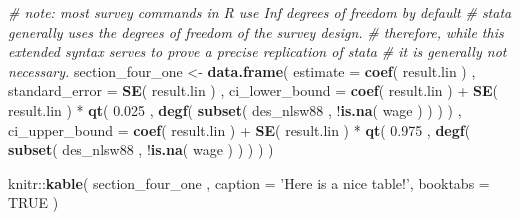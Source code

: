 \documentclass[]{book}
\newenvironment{Shaded}{\begin{snugshade}}{\end{snugshade}}
\newcommand{\KeywordTok}[1]{\textcolor[rgb]{0.13,0.29,0.53}{\textbf{{#1}}}}
\newcommand{\DataTypeTok}[1]{\textcolor[rgb]{0.13,0.29,0.53}{{#1}}}
\newcommand{\FloatTok}[1]{\textcolor[rgb]{0.00,0.00,0.81}{{#1}}}
\newcommand{\StringTok}[1]{\textcolor[rgb]{0.31,0.60,0.02}{{#1}}}
\newcommand{\CommentTok}[1]{\textcolor[rgb]{0.56,0.35,0.01}{\textit{{#1}}}}
\newcommand{\OtherTok}[1]{\textcolor[rgb]{0.56,0.35,0.01}{{#1}}}
\newcommand{\NormalTok}[1]{{#1}}
\begin{document}
\begin{Shaded}
\begin{Highlighting}[]
\CommentTok{# note: most survey commands in R use Inf degrees of freedom by default}
\CommentTok{# stata generally uses the degrees of freedom of the survey design.}
\CommentTok{# therefore, while this extended syntax serves to prove a precise replication of stata}
\CommentTok{# it is generally not necessary.}
\NormalTok{section_four_one <-}
\StringTok{    }\KeywordTok{data.frame}\NormalTok{( }
        \DataTypeTok{estimate =} \KeywordTok{coef}\NormalTok{( result.lin ) , }
        \DataTypeTok{standard_error =} \KeywordTok{SE}\NormalTok{( result.lin ) , }
        \DataTypeTok{ci_lower_bound =} 
            \KeywordTok{coef}\NormalTok{( result.lin ) +}\StringTok{ }
\StringTok{            }\KeywordTok{SE}\NormalTok{( result.lin ) *}\StringTok{ }
\StringTok{            }\KeywordTok{qt}\NormalTok{( }\FloatTok{0.025} \NormalTok{, }\KeywordTok{degf}\NormalTok{( }\KeywordTok{subset}\NormalTok{( des_nlsw88 , !}\KeywordTok{is.na}\NormalTok{( wage ) ) ) ) ,}
        \DataTypeTok{ci_upper_bound =} 
            \KeywordTok{coef}\NormalTok{( result.lin ) +}\StringTok{ }
\StringTok{            }\KeywordTok{SE}\NormalTok{( result.lin ) *}\StringTok{ }
\StringTok{            }\KeywordTok{qt}\NormalTok{( }\FloatTok{0.975} \NormalTok{, }\KeywordTok{degf}\NormalTok{( }\KeywordTok{subset}\NormalTok{( des_nlsw88 , !}\KeywordTok{is.na}\NormalTok{( wage ) ) ) )}
    \NormalTok{)}
    

\NormalTok{knitr::}\KeywordTok{kable}\NormalTok{(}
  \NormalTok{section_four_one , }\DataTypeTok{caption =} \StringTok{'Here is a nice table!'}\NormalTok{,}
  \DataTypeTok{booktabs =} \OtherTok{TRUE}
\NormalTok{)}
\end{Highlighting}
\end{Shaded}
\end{document}
